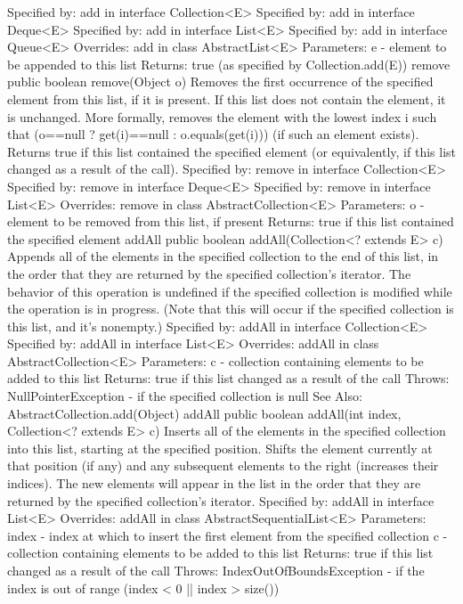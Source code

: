 \documentclass[babel]{book}
\begin{document}
Specified by:
add in interface Collection<E>
Specified by:
add in interface Deque<E>
Specified by:
add in interface List<E>
Specified by:
add in interface Queue<E>
Overrides:
add in class AbstractList<E>
Parameters:
e - element to be appended to this list
Returns:
true (as specified by Collection.add(E))
remove
public boolean remove(Object o)
Removes the first occurrence of the specified element from this list, if it is present. If this list does not contain the element, it is unchanged. More formally, removes the element with the lowest index i such that (o==null ? get(i)==null : o.equals(get(i))) (if such an element exists). Returns true if this list contained the specified element (or equivalently, if this list changed as a result of the call).
Specified by:
remove in interface Collection<E>
Specified by:
remove in interface Deque<E>
Specified by:
remove in interface List<E>
Overrides:
remove in class AbstractCollection<E>
Parameters:
o - element to be removed from this list, if present
Returns:
true if this list contained the specified element
addAll
public boolean addAll(Collection<? extends E> c)
Appends all of the elements in the specified collection to the end of this list, in the order that they are returned by the specified collection's iterator. The behavior of this operation is undefined if the specified collection is modified while the operation is in progress. (Note that this will occur if the specified collection is this list, and it's nonempty.)
Specified by:
addAll in interface Collection<E>
Specified by:
addAll in interface List<E>
Overrides:
addAll in class AbstractCollection<E>
Parameters:
c - collection containing elements to be added to this list
Returns:
true if this list changed as a result of the call
Throws:
NullPointerException - if the specified collection is null
See Also:
AbstractCollection.add(Object)
addAll
public boolean addAll(int index,
Collection<? extends E> c)
Inserts all of the elements in the specified collection into this list, starting at the specified position. Shifts the element currently at that position (if any) and any subsequent elements to the right (increases their indices). The new elements will appear in the list in the order that they are returned by the specified collection's iterator.
Specified by:
addAll in interface List<E>
Overrides:
addAll in class AbstractSequentialList<E>
Parameters:
index - index at which to insert the first element from the specified collection
c - collection containing elements to be added to this list
Returns:
true if this list changed as a result of the call
Throws:
IndexOutOfBoundsException - if the index is out of range (index < 0 || index > size())
\end{document}
